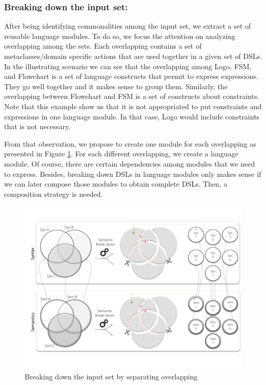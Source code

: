 \subsubsection{Breaking down the input set:} After being identifying commonalities among the input set, we extract a set of reusable language modules. To do so, we focus the attention on analyzing overlapping among the sets. Each overlapping contains a set of metaclasses/domain specific actions that are used together in a given set of DSLs. In the illustrating scenario we can see that the overlapping among Logo, FSM, and Flowchart is a set of language constructs that permit to express expressions. They go well together and it makes sense to group them. Similarly, the overlapping between Flowchart and FSM is a set of constructs about constraints. Note that this example show us that it is not appropriated to put constraints and expressions in one language module. In that case, Logo would include constraints that is not necessary. 

From that observation, we propose to create one module for each overlapping as presented in Figure \ref{fig:breakingdown}. For each different overlapping, we create a language module. Of course, there are certain dependencies among modules that we need to express. Besides, breaking down DSLs in language modules only makes sense if we can later compose those modules to obtain complete DSLs. Then, a composition strategy is needed. 

\begin{figure}
\centering
\includegraphics[width=1\linewidth]{images/breakdown.pdf}
\caption{Breaking down the input set by separating overlapping}
\label{fig:breakingdown}
\end{figure}

